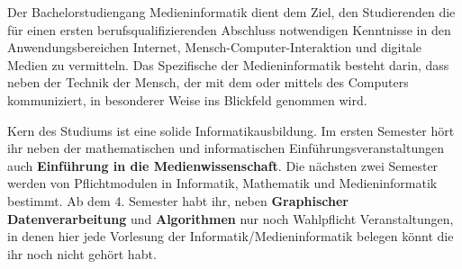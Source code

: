 Der Bachelorstudiengang Medieninformatik dient dem Ziel, den Studierenden die für einen ersten berufsqualifizierenden Abschluss notwendigen Kenntnisse in den Anwendungsbereichen Internet, Mensch-Computer-Interaktion und digitale Medien zu vermitteln. Das  Spezifische  der  Medieninformatik besteht darin, dass neben der Technik der Mensch, der mit dem oder mittels des Computers kommuniziert, in besonderer Weise ins Blickfeld genommen wird.

Kern des Studiums ist eine solide Informatikausbildung. Im ersten Semester hört ihr neben der mathematischen und informatischen Einführungsveranstaltungen auch \textbf{Einführung in die Medienwissenschaft}. Die  nächsten  zwei  Semester  werden  von  Pflichtmodulen  in  Informatik,  Mathematik  und  Medieninformatik  bestimmt. Ab dem 4. Semester habt ihr, neben \textbf{Graphischer Datenverarbeitung} und \textbf{Algorithmen} nur noch Wahlpflicht Veranstaltungen, in denen hier jede Vorlesung der Informatik/Medieninformatik belegen könnt die ihr noch nicht gehört habt.

